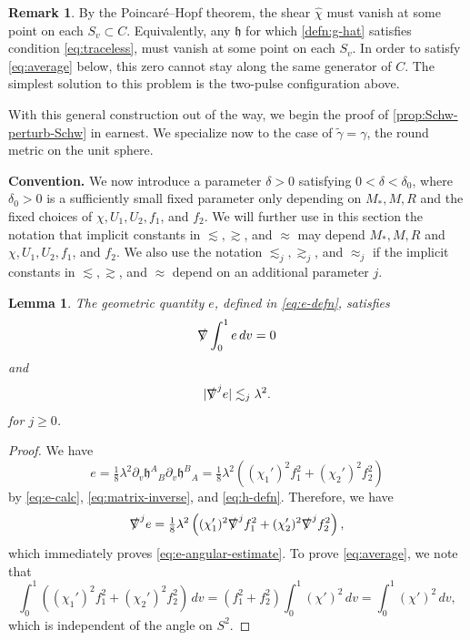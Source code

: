 \documentclass[10pt]{article}
\numberwithin{equation}{section}
\theoremstyle{plain}
\newtheorem{lem}{Lemma}[section]
\theoremstyle{definition}
\newtheorem{rk}{Remark}[section]
\newcommand{\les}{\lesssim}
\begin{document}
\begin{rk}
 By the Poincar\'e--Hopf theorem, the shear $\hat\chi$ must vanish at some point on each $S_v\subset C$. Equivalently, any $\mathfrak h$ for which \eqref{defn:g-hat} satisfies condition \eqref{eq:traceless}, must vanish at some point on each $S_v$. In order to satisfy \eqref{eq:average} below, this zero cannot stay along the same generator of $C$. The simplest solution to this problem is the two-pulse configuration above.  
\end{rk}

With this general construction out of the way, we begin the proof of \cref{prop:Schw-perturb-Schw} in earnest. We specialize now to the case of $\tilde\gamma =\gamma$, the round metric on the unit sphere.

\textbf{Convention.} We now introduce a parameter $\delta>0$ satisfying $0< \delta < \delta_0$, where $\delta_0>0$ is a sufficiently small fixed parameter only depending on $M_*, M, R$ and the fixed choices of $\chi, U_1,U_2, f_1$, and $f_2$. We will further use in this section the notation that implicit constants in $\lesssim, \gtrsim$, and $ \approx$ may depend $M_*, M, R$ and $\chi, U_1,U_2, f_1$, and $f_2$.  We also use the notation $\lesssim_j, \gtrsim_j$, and $ \approx_j$ if the implicit constants in $\lesssim, \gtrsim$, and $ \approx$ depend on an additional parameter $j$.

\begin{lem}
The geometric quantity $e$, defined in \eqref{eq:e-defn}, satisfies 
\begin{equation}
    \slashed\nabla \int_0^1 e\,dv=0 \label{eq:average}
\end{equation}
and 
\begin{equation}
    |\slashed \nabla^j e|\les_j \lambda^2. \label{eq:e-angular-estimate}
\end{equation}
for $j\geq 0$. 
\end{lem}
\begin{proof}
We have
\begin{equation}
e = \tfrac 18 \lambda^2 \partial_v \mathfrak h^A{}_B\partial_v\mathfrak h^B{}_A = \tfrac 18 \lambda^2 \left((\chi_1')^2 f_1^2 + (\chi_2')^2 f_2^2\right)\nonumber
\end{equation}
by \eqref{eq:e-calc}, \eqref{eq:matrix-inverse}, and \eqref{eq:h-defn}. Therefore, we have
\begin{equation}
\slashed \nabla^j e = \tfrac 18 \lambda^2 \left((\chi_1')^2 \slashed\nabla^j f_1^2 +(\chi_2')^2\slashed\nabla^j f_2^2\right),\nonumber
\end{equation}
which immediately proves \eqref{eq:e-angular-estimate}. To prove \eqref{eq:average}, we note that 
\begin{equation}
\int_0^1 \left((\chi_1')^2 f_1^2 + (\chi_2')^2 f_2^2\right)\,dv = \left(f_1^2 +f_2^2\right)\int_0^1 (\chi')^2\,dv=\int_0^1 (\chi')^2\,dv,\nonumber
\end{equation}
which is independent of the angle on $S^2$. 
\end{proof}
\end{document}
